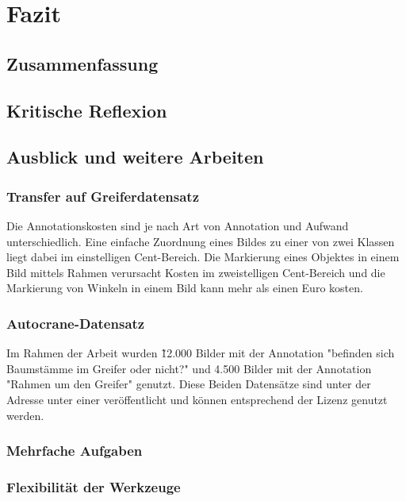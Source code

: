 \chapter{Fazit}
\label{chap:Fazit}

	\section{Zusammenfassung}
	\label{sec:Zusammenfassung}
			
	\section{Kritische Reflexion}
	\label{sec:KritischeReflexion}
				
	\section{Ausblick und weitere Arbeiten}
	\label{sec:AusblickWeitereArbeiten}


	\subsection{Transfer auf Greiferdatensatz}
	\label{subsec:TransferGreiferDatensatz}
 	Die Annotationskosten sind je nach Art von Annotation und Aufwand unterschiedlich. Eine einfache Zuordnung eines Bildes zu einer von zwei Klassen liegt dabei im einstelligen Cent-Bereich. Die Markierung eines Objektes in einem Bild mittels Rahmen verursacht Kosten im zweistelligen Cent-Bereich und die Markierung von Winkeln in einem Bild kann mehr als einen Euro kosten. 		

	\subsection{Autocrane-Datensatz}
	\label{subsec:AutocraneDatensatz}	
	Im Rahmen der Arbeit wurden \~ 12.000 Bilder mit der Annotation "befinden sich Baumstämme im Greifer oder nicht?" und 4.500 Bilder mit der Annotation "Rahmen um den Greifer" genutzt. Diese Beiden Datensätze sind unter der Adresse  unter einer  veröffentlicht und können entsprechend der Lizenz genutzt werden.  


	\subsection{Mehrfache Aufgaben}
	\label{subsec:MehrfacheAufgaben}

	\subsection{Flexibilität der Werkzeuge}
	\label{subsec:FlexibilitätDerWerkzeuge}
